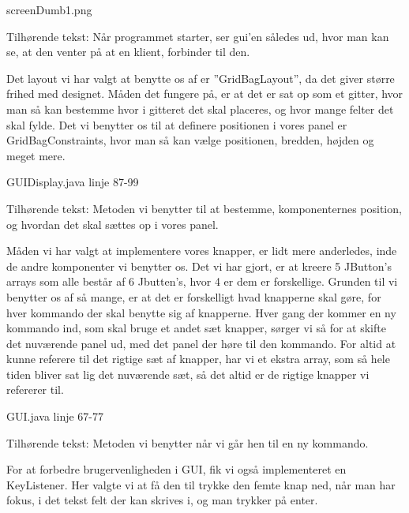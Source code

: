 \documentclass[a4paper]{article}
\begin{document}
\begin{center}
screenDumb1.png

Tilhørende tekst: Når programmet starter, ser gui’en således ud, hvor man kan se, at den venter på at en klient, forbinder til den.
\end{center}

Det layout vi har valgt at benytte os af er ”GridBagLayout”, da det giver større frihed med designet. Måden det fungere på, er at det er sat op som et gitter, hvor man så kan bestemme hvor i gitteret det skal placeres, og hvor mange felter det skal fylde. Det vi benytter os til at definere positionen i vores panel er GridBagConstraints, hvor man så kan vælge positionen, bredden, højden og meget mere.

\begin{center}
GUIDisplay.java linje 87-99

Tilhørende tekst: Metoden vi benytter til at bestemme, komponenternes position, og hvordan det skal sættes op i vores panel.
\end{center}

Måden vi har valgt at implementere vores knapper, er lidt mere anderledes, inde de andre komponenter vi benytter os. Det vi har gjort, er at kreere 5 JButton’s arrays som alle består af 6 Jbutten’s, hvor 4 er dem er forskellige. Grunden til vi benytter os af så mange, er at det er forskelligt hvad knapperne skal gøre, for hver kommando der skal benytte sig af knapperne. Hver gang der kommer en ny kommando ind, som skal bruge et andet sæt knapper, sørger vi så for at skifte det nuværende panel ud, med det panel der høre til den kommando. For altid at kunne referere til det rigtige sæt af knapper, har vi et ekstra array, som så hele tiden bliver sat lig det nuværende sæt, så det altid er de rigtige knapper vi refererer til.

\begin{center}
GUI.java linje 67-77

Tilhørende tekst: Metoden vi benytter når vi går hen til en ny kommando.
\end{center}

For at forbedre brugervenligheden i GUI, fik vi også implementeret en KeyListener. Her valgte vi at få den til trykke den femte knap ned, når man har fokus, i det tekst felt der kan skrives i, og man trykker på enter.



\end{document}
